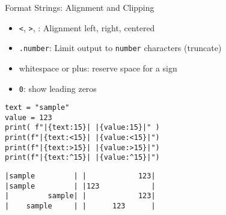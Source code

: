 \begin{frame}[fragile]{Format Strings: Alignment and Clipping}
%
\begin{itemize}
\item \texttt{<}, \texttt{>}, \inPy{^}: Alignment left, right, centered
\item \texttt{.number}: Limit output to \texttt{number} characters (truncate)
\item whitespace or plus: reserve space for a sign
\item \texttt{0}: show leading zeros
\end{itemize}
%
\begin{codebox}[Code: Format Strings (3), width=.49\linewidth, nobeforeafter, equal height group = grpFormatString3]
\begin{verbatim}
text = "sample"
value = 123
print( f"|{text:15}| |{value:15}|" )
print(f"|{text:<15}| |{value:<15}|")
print(f"|{text:>15}| |{value:>15}|")
print(f"|{text:^15}| |{value:^15}|")
\end{verbatim}
\end{codebox}
%
\begin{cmdbox}[Output: Format Strings (3), width=.49\linewidth, nobeforeafter, equal height group = grpFormatString3]
\begin{verbatim}
|sample         | |            123|
|sample         | |123            |
|         sample| |            123|
|    sample     | |      123      |
\end{verbatim}
\end{cmdbox}
%
\end{frame}


